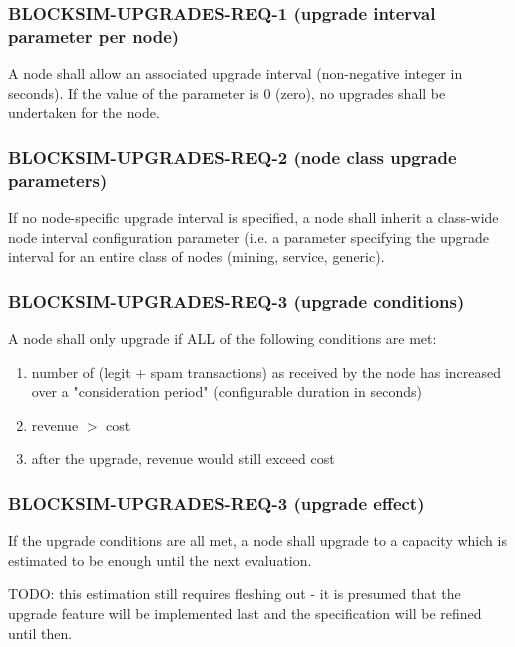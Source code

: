\documentclass{scrreprt}
\begin{document}
\subsubsection{BLOCKSIM-UPGRADES-REQ-1 (upgrade interval parameter per node)}

A node shall allow an associated upgrade interval (non-negative integer in seconds).
If the value of the parameter is 0 (zero), no upgrades shall be undertaken
for the node.

\subsubsection{BLOCKSIM-UPGRADES-REQ-2 (node class upgrade parameters)}

If no node-specific upgrade interval is specified, a node shall inherit
a class-wide node interval configuration parameter (i.e. a parameter
specifying the upgrade interval for an entire class of nodes (mining,
service, generic).

\subsubsection{BLOCKSIM-UPGRADES-REQ-3 (upgrade conditions)}

A node shall only upgrade if ALL of the following conditions are met:

\begin{enumerate}
   \item number of (legit + spam transactions) as received by the node has increased
over a "consideration period" (configurable duration in seconds)

   \item revenue $>$ cost

   \item after the upgrade, revenue would still exceed cost
\end{enumerate}


\subsubsection{BLOCKSIM-UPGRADES-REQ-3 (upgrade effect)}
If the upgrade conditions are all met, a node shall upgrade to a capacity
which is estimated to be enough until the next evaluation.

TODO: this estimation still requires fleshing out - it is presumed that
the upgrade feature will be implemented last and the specification will
be refined until then.
\end{document}
